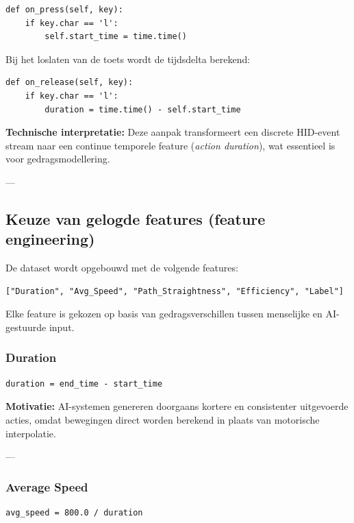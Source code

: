 \begin{verbatim}
def on_press(self, key):
    if key.char == 'l':
        self.start_time = time.time()
\end{verbatim}

Bij het loslaten van de toets wordt de tijdsdelta berekend:

\begin{verbatim}
def on_release(self, key):
    if key.char == 'l':
        duration = time.time() - self.start_time
\end{verbatim}

\textbf{Technische interpretatie:}
Deze aanpak transformeert een discrete HID-event stream naar een continue temporele feature (\textit{action duration}), wat essentieel is voor gedragsmodellering.

---

\subsection{Keuze van gelogde features (feature engineering)}

De dataset wordt opgebouwd met de volgende features:

\begin{verbatim}
["Duration", "Avg_Speed", "Path_Straightness", "Efficiency", "Label"]
\end{verbatim}

Elke feature is gekozen op basis van gedragsverschillen tussen menselijke en AI-gestuurde input.

\subsubsection{Duration}

\begin{verbatim}
duration = end_time - start_time
\end{verbatim}

\textbf{Motivatie:}  
AI-systemen genereren doorgaans kortere en consistenter uitgevoerde acties, omdat bewegingen direct worden berekend in plaats van motorische interpolatie.

---

\subsubsection{Average Speed}

\begin{verbatim}
avg_speed = 800.0 / duration
\end{verbatim}

